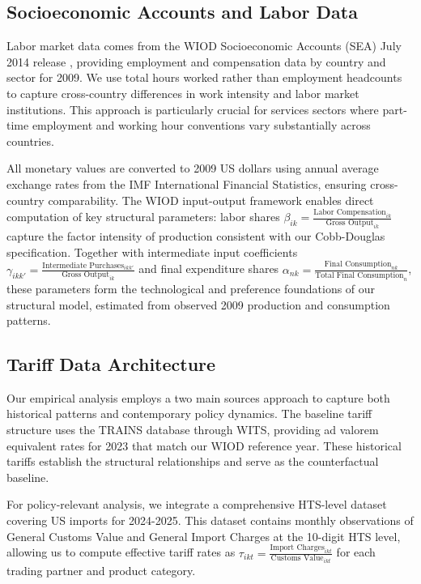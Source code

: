 

\subsection{Socioeconomic Accounts and Labor Data}

Labor market data comes from the WIOD Socioeconomic Accounts (SEA) July 2014 release \citep{timmer2015illustrated}, providing employment and compensation data by country and sector for 2009. We use total hours worked rather than employment headcounts to capture cross-country differences in work intensity and labor market institutions. This approach is particularly crucial for services sectors where part-time employment and working hour conventions vary substantially across countries.

All monetary values are converted to 2009 US dollars using annual average exchange rates from the IMF International Financial Statistics, ensuring cross-country comparability. The WIOD input-output framework enables direct computation of key structural parameters: labor shares $\beta_{ik} = \frac{\text{Labor Compensation}_{ik}}{\text{Gross Output}_{ik}}$ capture the factor intensity of production consistent with our Cobb-Douglas specification. Together with intermediate input coefficients $\gamma_{ikk'} = \frac{\text{Intermediate Purchases}_{ikk'}}{\text{Gross Output}_{ik}}$ and final expenditure shares $\alpha_{nk} = \frac{\text{Final Consumption}_{nk}}{\text{Total Final Consumption}_{n}}$, these parameters form the technological and preference foundations of our structural model, estimated from observed 2009 production and consumption patterns.

\subsection{Tariff Data Architecture}

Our empirical analysis employs a two main sources approach to capture both historical patterns and contemporary policy dynamics. The baseline tariff structure uses the TRAINS database through WITS, providing ad valorem equivalent rates for 2023 that match our WIOD reference year. These historical tariffs establish the structural relationships and serve as the counterfactual baseline.

For policy-relevant analysis, we integrate a comprehensive HTS-level dataset covering US imports for 2024-2025. This dataset contains monthly observations of General Customs Value and General Import Charges at the 10-digit HTS level, allowing us to compute effective tariff rates as $\tau_{ikt} = \frac{\text{Import Charges}_{ikt}}{\text{Customs Value}_{ikt}}$ for each trading partner and product category.


